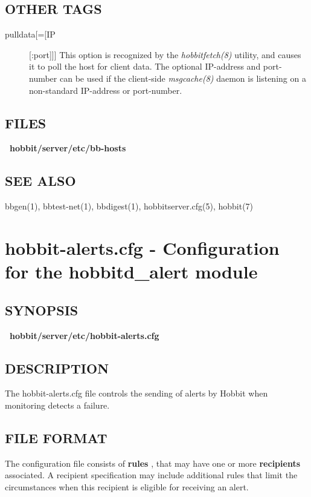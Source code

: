 \subsection{OTHER TAGS}
\begin{description}
\item[pulldata[=[IP][:port]]] This option is recognized by the
  \emph{hobbitfetch(8)} utility, and causes it to poll the host for
  client data. The optional IP-address and port-number can be used if
  the client-side \emph{msgcache(8)} daemon is listening on a
  non-standard IP-address or port-number. 


 

\end{description}
\subsection{FILES}
\textbf{~hobbit/server/etc/bb-hosts}


 
\subsection{SEE ALSO}
bbgen(1), bbtest-net(1), bbdigest(1), hobbitserver.cfg(5), hobbit(7) 

 

%
\newpage
\section{hobbit-alerts.cfg - Configuration for the hobbitd\_alert module}
 
\subsection{SYNOPSIS}
\textbf{~hobbit/server/etc/hobbit-alerts.cfg}


 
\subsection{DESCRIPTION}
 The hobbit-alerts.cfg file controls the sending of alerts by Hobbit when monitoring detects a failure. 

 
\subsection{FILE FORMAT}
 The configuration file consists of \textbf{rules}
, that may have one or more \textbf{recipients}
 associated. A recipient specification may include additional rules that limit the circumstances when this recipient is eligible for receiving an alert. 

